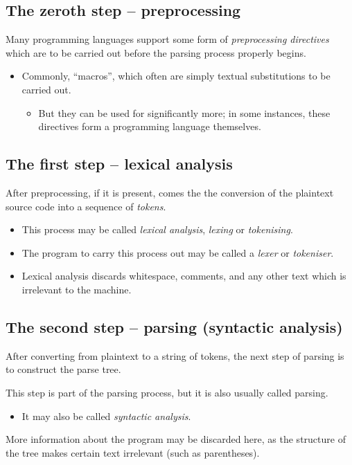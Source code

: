 \documentclass[11pt]{article}
\theoremstyle{definition}
\begin{document}
\subsection{The zeroth step – preprocessing}
\label{sec:org20ad543}
Many programming languages support some form
of \emph{preprocessing directives} which are
to be carried out before the parsing process
properly begins.
\begin{itemize}
\item Commonly, “macros”, which often are simply
textual substitutions to be carried out.
\begin{itemize}
\item But they can be used for significantly more;
in some instances, these directives
form a programming language themselves.
\end{itemize}
\end{itemize}

\subsection{The first step – lexical analysis}
\label{sec:org566a16a}
After preprocessing, if it is present, comes the
the conversion of the plaintext source code
into a sequence of \emph{tokens}.
\begin{itemize}
\item This process may be
called \emph{lexical analysis}, \emph{lexing} or \emph{tokenising}.
\item The program to carry this process out may be
called a \emph{lexer} or \emph{tokeniser}.
\item Lexical analysis discards whitespace, comments, and any other
text which is irrelevant to the machine.
\end{itemize}

\subsection{The second step – parsing (syntactic analysis)}
\label{sec:org1db1ff2}
After converting from plaintext to a string of tokens, the next
step of parsing is to construct the parse tree.

This step is part of the parsing process,
but it is also usually called parsing.
\begin{itemize}
\item It may also be called \emph{syntactic analysis}.
\end{itemize}

More information about the program may be discarded here,
as the structure of the tree makes certain text
irrelevant (such as parentheses).
\end{document}

